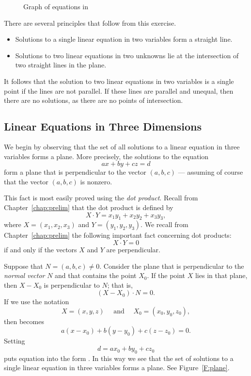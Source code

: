 \documentclass{ximera}
\begin{document}
\begin{figure}[htb]
                       \centerline{%
                       }
                       \caption{Graph of equations in \protect{}}
                       \label{lineint}
\end{figure}


There are several principles that follow from this exercise.
\begin{itemize}
\item   Solutions to a single linear equation in two variables
form a straight line.
\item Solutions to two linear equations in two unknowns lie at
the intersection of two straight lines in the plane.
\end{itemize}
It follows that the solution to two linear equations in two
variables is a single point if the lines are not parallel.  If
these lines are parallel and unequal, then there are no
solutions, as there are no points of intersection.

\subsection*{Linear Equations in Three Dimensions}

We begin by observing that the set of all solutions to a linear
equation in three variables forms a plane.  More
precisely, the solutions to the equation
\begin{equation} \label{abcd}
ax+by+cz=d
\end{equation}
form a plane that is perpendicular to the vector $(a,b,c)$ ---
assuming of course that the vector $(a,b,c)$ is nonzero.

This fact is most easily proved using the {\em dot product\/}.
Recall from Chapter~\ref{chap:prelim}  that
the dot product is defined by
\[
X\cdot Y = x_1y_1+x_2y_2+x_3y_3,
\]
where $X=(x_1,x_2,x_3)$ and $Y=(y_1,y_2,y_3)$.  We recall from
Chapter~\ref{chap:prelim}  the following important
fact concerning dot products:
\[
X\cdot Y = 0
\]
if and only if the vectors $X$ and $Y$ are perpendicular.

Suppose that $N=(a,b,c)\neq 0$.  Consider the plane that is perpendicular
to the {\em normal vector\/} $N$ and that contains the
point $X_0$.  If the point $X$ lies in that plane, then $X-X_0$ is
perpendicular to $N$; that is,
\begin{equation} \label{XX_0}
(X-X_0)\cdot N = 0.
\end{equation}
If we use the notation
\[
X=(x,y,z) \quad \mbox{ and } \quad X_0=(x_0,y_0,z_0),
\]
then  becomes
\[
a(x-x_0)+b(y-y_0)+c(z-z_0)=0.
\]
Setting
\[
d=ax_0 + by_0 + cz_0
\]
puts equation  into the form .  In this way
we see that the set of solutions to a single linear equation in
three variables forms a plane.  See Figure~\ref{F:plane}.
\end{document}
